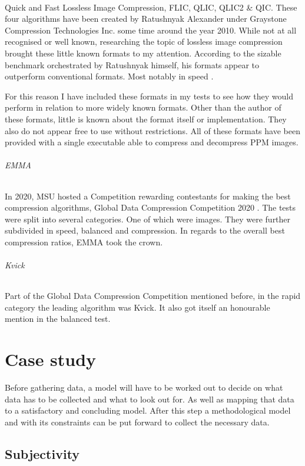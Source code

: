 \documentclass[11pt,a4paper]{report}
\begin{document}
\subparagraph{\cite{lpcb}}
    
Quick and Fast Lossless Image Compression, FLIC, QLIC, QLIC2 \& QIC. These four algorithms have been created by Ratushnyak Alexander under Graystone Compression Technologies Inc. some time around the year 2010. While not at all recognised or well known, researching the topic of lossless image compression brought these little known formats to my attention. According to the sizable benchmark orchestrated by Ratushnyak himself, his formats appear to outperform conventional formats. Most notably in speed \cite{lpcb}.
        
For this reason I have included these formats in my tests to see how they would perform in relation to more widely known formats. Other than the author of these formats, little is known about the format itself or implementation. They also do not appear free to use without restrictions. All of these formats have been provided with a single executable able to compress and decompress PPM images.

\subparagraph{EMMA}

In 2020, MSU hosted a Competition rewarding contestants for making the best compression algorithms, Global Data Compression Competition 2020 \cite{dcgc}. The tests were split into several categories. One of which were images. They were further subdivided in speed, balanced and compression. In regards to the overall best compression ratios, EMMA took the crown.
    
\subparagraph{Kvick}

Part of the Global Data Compression Competition mentioned before, in the rapid category the leading algorithm was Kvick. It also got itself an honourable mention in the balanced test.

\newpage

\chapter{Case study}

Before gathering data, a model will have to be worked out to decide on what data has to be collected and what to look out for. As well as mapping that data to a satisfactory and concluding model. After this step a methodological model and with its constraints can be put forward to collect the necessary data.

\section{Subjectivity}
\end{document}
